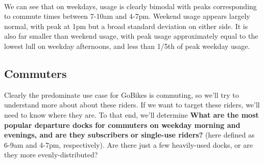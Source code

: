 \documentclass[11pt]{article}
\begin{document}
    \begin{center}
    \end{center}
    { \hspace*{\fill} \\}
    
    We can see that on weekdays, usage is clearly bimodal with peaks
corresponding to commute times between 7-10am and 4-7pm. Weekend usage
appears largely normal, with peak at 1pm but a broad standard deviation
on either side. It is also far smaller than weekend usage, with peak
usage approximately equal to the lowest lull on weekday afternoons, and
less than 1/5th of peak weekday usage.

\subsection{Commuters}\label{commuters}

Clearly the predominate use case for GoBikes is commuting, so we'll try
to understand more about about these riders. If we want to target these
riders, we'll need to know where they are. To that end, we'll determine
\textbf{What are the most popular departure docks for commuters on
weekday morning and evenings, and are they subscribers or single-use
riders?} (here defined as 6-9am and 4-7pm, respectively). Are there just
a few heavily-used docks, or are they more evenly-distributed?
\end{document}
